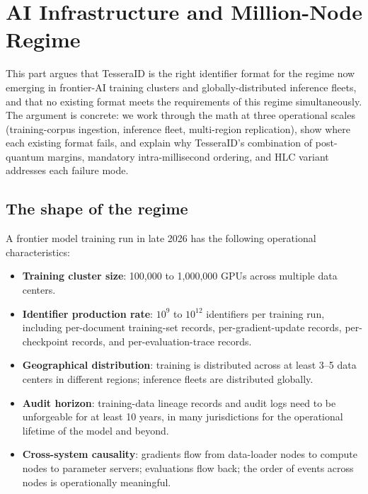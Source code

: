 \section{AI Infrastructure and Million-Node Regime}
\label{sec:ai-scale}

This part argues that TesseraID is the right identifier format for the regime now emerging in frontier-AI training clusters and globally-distributed inference fleets, and that no existing format meets the requirements of this regime simultaneously. The argument is concrete: we work through the math at three operational scales (training-corpus ingestion, inference fleet, multi-region replication), show where each existing format fails, and explain why TesseraID's combination of post-quantum margins, mandatory intra-millisecond ordering, and HLC variant addresses each failure mode.

\subsection{The shape of the regime}

A frontier model training run in late 2026 has the following operational characteristics:

\begin{itemize}
  \item \textbf{Training cluster size}: 100{,}000 to 1{,}000{,}000 GPUs across multiple data centers.
  \item \textbf{Identifier production rate}: $10^9$ to $10^{12}$ identifiers per training run, including per-document training-set records, per-gradient-update records, per-checkpoint records, and per-evaluation-trace records.
  \item \textbf{Geographical distribution}: training is distributed across at least 3--5 data centers in different regions; inference fleets are distributed globally.
  \item \textbf{Audit horizon}: training-data lineage records and audit logs need to be unforgeable for at least 10 years, in many jurisdictions for the operational lifetime of the model and beyond.
  \item \textbf{Cross-system causality}: gradients flow from data-loader nodes to compute nodes to parameter servers; evaluations flow back; the order of events across nodes is operationally meaningful.
\end{itemize}

